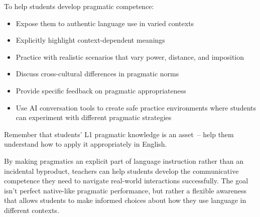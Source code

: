 \begin{tcolorbox}[title=Teaching Pragmatic Competence, colback=white]
To help students develop pragmatic competence:
\begin{itemize}[noitemsep]
    \item Expose them to authentic language use in varied contexts
    \item Explicitly highlight context-dependent meanings
    \item Practice with realistic scenarios that vary power, distance, and imposition
    \item Discuss cross-cultural differences in pragmatic norms
    \item Provide specific feedback on pragmatic appropriateness
    \item Use AI conversation tools to create safe practice environments where students can experiment with different pragmatic strategies
\end{itemize}
Remember that students' L1 pragmatic knowledge is an asset~-- help them understand how to apply it appropriately in English.
\end{tcolorbox}

By making pragmatics an explicit part of language instruction rather than an incidental byproduct, teachers can help students develop the communicative competence they need to navigate real-world interactions successfully. The goal isn't perfect native-like pragmatic performance, but rather a flexible awareness that allows students to make informed choices about how they use language in different contexts.